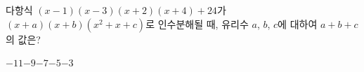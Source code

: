 다항식 $(x-1)(x-3)(x+2)(x+4)+24$가 $(x+a)(x+b)(x^2+x+c)$로 인수분해될 때, 유리수 $a$, $b$, $c$에 대하여 $a+b+c$의 값은?
\begin{choices32}{$-11$}{$-9$}{$-7$}{$-5$}{$-3$}\end{choices32}
